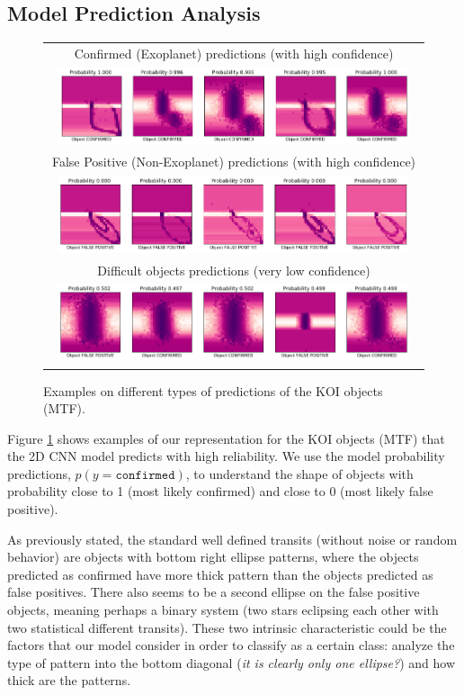 \subsection{Model Prediction Analysis}
\begin{figure}[!t]
    \centering
\begin{tabular}{c}
    Confirmed (Exoplanet) predictions (with high confidence) \\
    \includegraphics[width=0.95\textwidth]{imgs/MTF_confE_data_v2.png}  \\
    False Positive (Non-Exoplanet) predictions (with high confidence) \\
     \includegraphics[width=0.95\textwidth]{imgs/MTF_confNE_data_v2.png} \\
    Difficult objects predictions (very low confidence) \\
    \includegraphics[width=0.95\textwidth]{imgs/MTF_diff_data_v2.png}
\end{tabular}
\caption{Examples on different types of predictions of the KOI objects (MTF).}
\label{fig:mtf_pred_ex}
\end{figure} %
Figure \ref{fig:mtf_pred_ex} shows examples of our representation for the KOI objects (MTF) that the 2D CNN model predicts with high reliability. We use the model probability predictions, $p(y=\texttt{confirmed})$, to understand the shape of objects with probability close to 1 (most likely confirmed) and close to 0 (most likely false positive). 

As previously stated, the standard well defined transits (without noise or random behavior) are objects with bottom right ellipse patterns, where the objects predicted as confirmed have more thick pattern than the objects predicted as false positives.
There also seems to be a second ellipse on the false positive objects, meaning perhaps a binary system (two stars eclipsing each other with two statistical different transits). 
These two intrinsic characteristic could be the factors that our model consider in order to classify as a certain class: analyze the type of pattern into the bottom diagonal (\textit{it is clearly only one ellipse?}) and how thick are the patterns.

